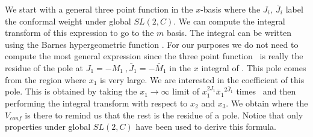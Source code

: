 We start with a general three point function in the $x$-basis
\eqn{}
where the $J_i,~\bar J_i$ label
 the conformal weight under global $SL(2,C)$.
We can compute the integral transform of
this expression to go to  the $m$ basis. The integral can be written
using the Barnes hypergeometric function \SatohBI .
For our purposes
 we do not need to compute the most general expression since the
three point function \zamresm\ is really the residue of the pole
 at $J_1=-M_1 ~,\bar J_1 = - \bar M_1$
in the $x$ integral of \threept .
This pole comes  from the region where
$x_1$ is very large.
We  are interested in the coefficient of this pole.
This
is obtained by  taking the $x_1 \to \infty$
limit of $ x_1^{2J_1} {\bar x_1}^{2 \bar J_1 }$
times \threept\ and then
performing the integral transform with respect to $x_2$ and $x_3$.
We obtain
\eqn{}
where the $V_{conf}$ is there
to remind us that the rest is the residue of a pole.
Notice that only properties under global $SL(2,C)$ have been used to
derive this formula.



